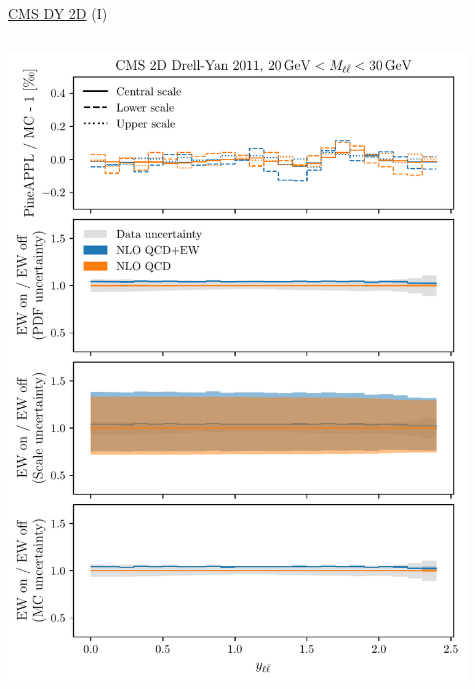 \begin{frame}{\href{https://arxiv.org/abs/1412.1115}{CMS DY 2D} (I)}
\begin{columns}
\begin{column}{0.5\textwidth}
\includegraphics[width=0.95\textwidth]{ew_corrections/figures/pineappl_CMSDY2D11_bin1}
\end{column}
\begin{column}{0.5\textwidth}

\end{column}
\end{columns}
\end{frame}
